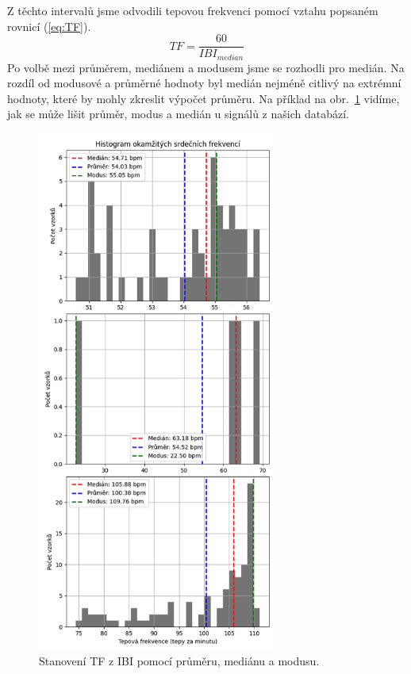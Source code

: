 Z těchto intervalů jsme odvodili tepovou frekvenci pomocí vztahu popsaném rovnicí (\ref{eq:TF}).
\begin{equation}
	\label{eq:TF}
	TF = \frac{60}{IBI_{median}}
\end{equation}
Po volbě mezi průměrem, mediánem a modusem jsme se rozhodli pro medián.
Na rozdíl od modusové a průměrné hodnoty byl medián nejméně citlivý na extrémní hodnoty, které by mohly zkreslit výpočet průměru.
Na příklad na obr.~\ref{fig:HR_hist} vidíme, jak se může lišit průměr, modus a medián u signálů z našich databází.

\begin{figure}[b]
	\label{fig:HR_hist}
	\centering
	\includegraphics[width=0.7\textwidth]{./obrazky/HR_Hist.png}
	\caption[Histogram IBI]{Stanovení TF z IBI pomocí průměru, mediánu a modusu.}
	\vspace{-5mm}
\end{figure}


